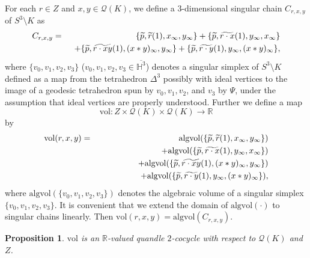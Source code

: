 \documentclass[12pt]{amsart}
\newtheorem{proposition}[theorem]{Proposition}
\theoremstyle{definition}
\begin{document}
For each $r \in Z$ and $x, y \in \mathcal{Q}(K)$, we define a $3$-dimensional singular chain $C_{r, x, y}$ of $S^{3} \setminus K$ as
\begin{eqnarray*}
 C_{r, x, y} & = & \{ \widetilde{p}, \widetilde{r}(1), x_{\infty}, y_{\infty} \} + \{ \widetilde{p}, \widetilde{r \cdot x}(1), y_{\infty}, x_{\infty} \} \\
 & & \hskip 0.5em + \{ \widetilde{p}, \widetilde{r \cdot x y}(1), (x \ast y)_{\infty}, y_{\infty} \} + \{ \widetilde{p}, \widetilde{r \cdot y}(1), y_{\infty}, (x \ast y)_{\infty} \},
\end{eqnarray*}
where $\{ v_{0}, v_{1}, v_{2}, v_{3} \}$ ($v_{0}, v_{1}, v_{2}, v_{3} \in \overline{\mathbb{H}^{3}}$) denotes a singular simplex of $S^{3} \setminus K$ defined as a map from the tetrahedron $\Delta^{3}$ possibly with ideal vertices to the image of a geodesic tetrahedron spun by $v_{0}, v_{1}, v_{2}$, and $v_{3}$ by $\Psi$, under the assumption that ideal vertices are properly understood.
Further we define a map
\[
 \mathrm{vol} : Z \times \mathcal{Q}(K) \times \mathcal{Q}(K) \longrightarrow \mathbb{R}
\]
by
\begin{eqnarray*}
 \mathrm{vol}(r, x, y) & = & \mathrm{algvol}(\{ \widetilde{p}, \widetilde{r}(1), x_{\infty}, y_{\infty} \}) \\
 & & \hskip 1em + \mathrm{algvol}(\{ \widetilde{p}, \widetilde{r \cdot x}(1), y_{\infty}, x_{\infty} \}) \\
 & & \hskip 3em + \mathrm{algvol}(\{ \widetilde{p}, \widetilde{r \cdot x y}(1), (x \ast y)_{\infty}, y_{\infty} \}) \\
 & & \hskip 5em + \mathrm{algvol}(\{ \widetilde{p}, \widetilde{r \cdot y}(1), y_{\infty}, (x \ast y)_{\infty} \}),
\end{eqnarray*}
where $\mathrm{algvol}(\{ v_{0}, v_{1}, v_{2}, v_{3} \})$ denotes the algebraic volume of a singular simplex $\{ v_{0}, v_{1}, v_{2}, v_{3} \}$.
It is convenient that we extend the domain of $\mathrm{algvol}(\cdot)$ to singular chains linearly.
Then $\mathrm{vol}(r, x, y) = \mathrm{algvol}(C_{r, x, y})$.

\begin{proposition}\label{prop:2_cocycle}
$\mathrm{vol}$ is an $\mathbb{R}$-valued quandle $2$-cocycle with respect to $\mathcal{Q}(K)$ and $Z$.
\end{proposition}
\end{document}
